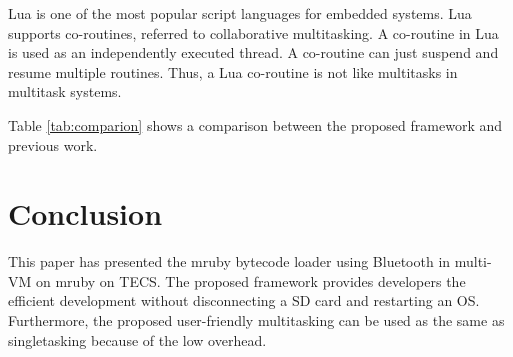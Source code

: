 \documentclass[conference,compsoc]{IEEEtran}
\begin{document}
Lua is one of the most popular script languages for embedded systems.
Lua supports co-routines, referred to collaborative multitasking.
A co-routine in Lua is used as an independently executed thread.
A co-routine can just suspend and resume multiple routines. 
Thus, a Lua co-routine is not like multitasks in multitask systems.

Table \ref{tab:comparion} shows a comparison between the proposed framework and previous work.

\section{Conclusion}
\label{sec:Conclusion}
This paper has presented the mruby bytecode loader using Bluetooth in multi-VM on mruby on TECS.
The proposed framework provides developers the efficient development without disconnecting a SD card and restarting an OS.
Furthermore, the proposed user-friendly multitasking can be used as the same as singletasking because of the low overhead.


\end{document}
